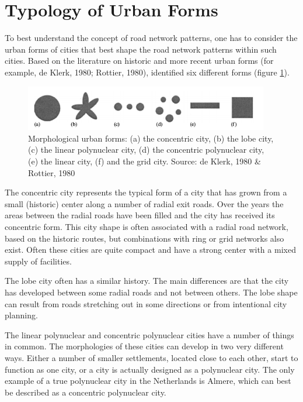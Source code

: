 
\section{Typology of Urban Forms}
To best understand the concept of road network patterns, one has to consider the urban forms of cities that best shape the road network patterns within such cities. Based on the literature on historic and more recent urban forms (for example, de Klerk, 1980; Rottier, 1980), identified six different forms (figure \ref{fig:urban forms}).
\begin{figure}[h]
\centering
\includegraphics[width=0.95\textwidth,center]{picture/figure1.png}
\caption[Morphological Urban Forms]{Morphological urban forms: (a) the concentric city, (b) the lobe city, (c) the linear polynuclear city, (d) the concentric polynuclear city, (e) the linear city, (f) and the grid city.  Source: de Klerk, 1980 \& Rottier, 1980}
\label{fig:urban forms}
\end{figure}

The concentric city represents the typical form of a city that has grown from a small (historic) center along a number of radial exit roads. Over the years the areas between the radial roads have been filled and the city has received its concentric form. This city shape is often associated with a radial road network, based on the historic routes, but combinations with ring or grid networks also exist. Often these cities are quite compact and have a strong center with a mixed supply of facilities.

The lobe city often has a similar history. The main differences are that the city has developed between some radial roads and not between others. The lobe shape can result from roads stretching out in some directions or from intentional city planning.

The linear polynuclear and concentric polynuclear cities have a number of things in common. The morphologies of these cities can develop in two very different ways. Either a number of smaller settlements, located close to each other, start to function as one city, or a city is actually designed as a polynuclear city. The only example of a true polynuclear city in the Netherlands is Almere, which can best be described as a concentric polynuclear city. 

